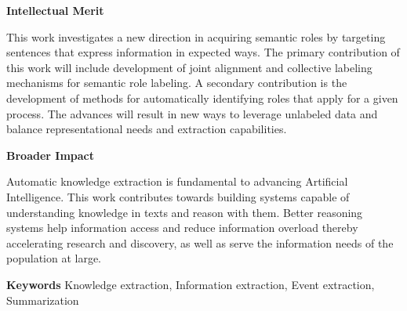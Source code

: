 {\bf Intellectual Merit} 

This work investigates a new direction in acquiring semantic roles by targeting sentences that express information in expected ways.
The primary contribution of this work will include development of joint alignment and collective labeling mechanisms for semantic role labeling.
A secondary contribution is the development of methods for automatically identifying roles that apply for a given process. 
The advances will result in new ways to leverage unlabeled data and balance representational needs and extraction capabilities.

{\bf Broader Impact}

Automatic knowledge extraction is fundamental to advancing Artificial Intelligence. 
This work contributes towards building systems capable of understanding knowledge in texts and reason with them.
Better reasoning systems help information access and reduce information overload thereby accelerating research and discovery, 
as well as serve the information needs of the population at large.

{\bf Keywords} Knowledge extraction, Information extraction, Event extraction, Summarization


%	
